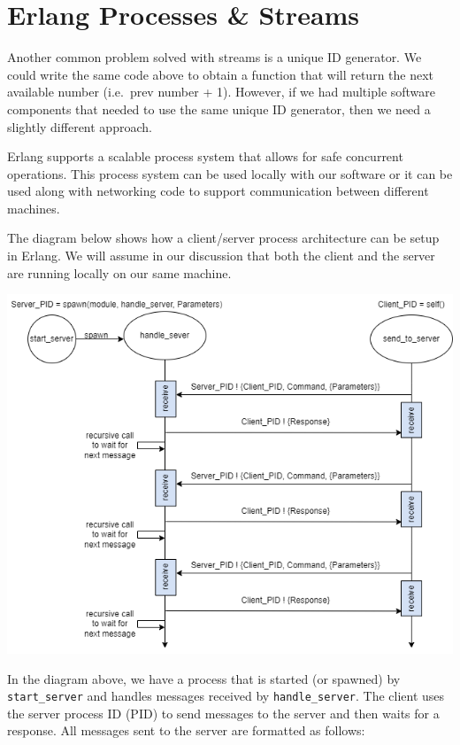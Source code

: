 \documentclass[
]{book}
\begin{document}
\hypertarget{erlang-processes-streams}{%
\section{Erlang Processes \& Streams}\label{erlang-processes-streams}}

Another common problem solved with streams is a unique ID generator. We could write the same code above to obtain a function that will return the next available number (i.e.~prev number + 1). However, if we had multiple software components that needed to use the same unique ID generator, then we need a slightly different approach.

Erlang supports a scalable process system that allows for safe concurrent operations. This process system can be used locally with our software or it can be used along with networking code to support communication between different machines.

The diagram below shows how a client/server process architecture can be setup in Erlang. We will assume in our discussion that both the client and the server are running locally on our same machine.

\includegraphics{images/client_server_erlang.drawio.png}

In the diagram above, we have a process that is started (or spawned) by \texttt{start\_server} and handles messages received by \texttt{handle\_server}. The client uses the server process ID (PID) to send messages to the server and then waits for a response. All messages sent to the server are formatted as follows:
\end{document}
